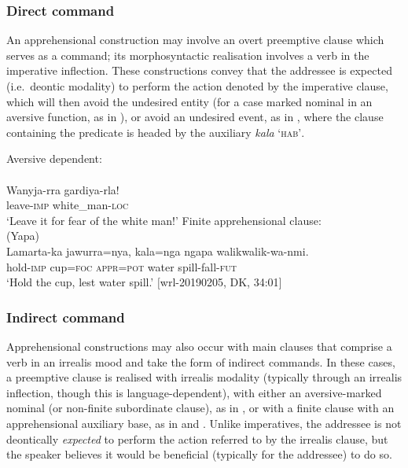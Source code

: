 \documentclass[output=paper,colorlinks,citecolor=brown]{langscibook}
\begin{document}
\subsubsection{Direct command}

An apprehensional construction may involve an overt preemptive clause which serves as a command; its morphosyntactic realisation involves a verb in the imperative inflection. These constructions convey that the addressee is expected (i.e.\  deontic modality) to perform the action denoted by the imperative clause, which will then avoid the undesired entity (for a case marked nominal in an aversive function, as in ), or avoid an undesired event, as in , where the clause containing the predicate is headed by the auxiliary \textit{kala} \textsc{`hab'}.

\ea \textnormal{Aversive dependent:} \\
 \\
\gll Wanyja-rra gardiya-rla! \\
leave-\textsc{imp} white\_man-\textsc{loc} \\
\glt `Leave it for fear of the white man!' 
\label{ex:bro72}
\z
\newpage
\ea \textnormal{Finite apprehensional clause:} \\
\textnormal{ (Yapa)} \\
\gll Lamarta-ka jawurra=nya, kala=nga ngapa walikwalik-wa-nmi. \\
hold-\textsc{imp} cup=\textsc{foc} \textsc{appr=pot} water spill-fall-\textsc{fut} \\
\glt `Hold the cup, lest water spill.' $[$wrl-20190205, DK, 34:01$]$
\label{ex:bro73}
\z

\subsubsection{Indirect command}

Apprehensional constructions may also occur with main clauses that comprise a verb in an irrealis mood and take the form of indirect commands. In these cases, a preemptive clause is realised with irrealis modality (typically through an irrealis inflection, though this is language-dependent), with either an aversive-marked nominal (or non-finite subordinate clause), as in , or with a finite clause with an apprehensional auxiliary base, as in  and . Unlike imperatives, the addressee is not deontically \textit{expected} to perform the action referred to by the irrealis clause, but the speaker believes it would be beneficial (typically for the addressee) to do so.
\end{document}

